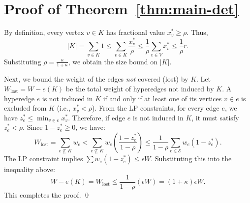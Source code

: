 \section{Proof of Theorem~\ref{thm:main-det}}
\label{app:mainproof}

By definition, every vertex $v \in K$ has fractional value $x^*_v \ge \rho$. Thus,
\begin{equation}
\label{eq:size-bound}
|K| = \sum_{v \in K} 1 \le \sum_{v \in K} \frac{x^*_v}{\rho} \le \frac{1}{\rho} \sum_{v \in V} x^*_v \le \frac{1}{\rho} r.
\end{equation}
Substituting $\rho = \frac{\kappa}{1+\kappa}$, we obtain the size bound on $|K|$.

Next, we bound the weight of the edges \emph{not} covered (lost) by $K$. Let $W_{\text{lost}} = W - e(K)$ be the total weight of hyperedges not induced by $K$. A hyperedge $e$ is not induced in $K$ if and only if at least one of its vertices $v \in e$ is excluded from $K$ (i.e., $x^*_v < \rho$). From the LP constraints, for every edge $e$, we have $z^*_e \le \min_{v \in e} x^*_v$. Therefore, if edge $e$ is not induced in $K$, it must satisfy $z^*_e < \rho$.  Since $1-z^*_e \ge 0$, we have:
\[
W_{\text{lost}} = \sum_{e \not\subseteq K} w_e < \sum_{e \not\subseteq K} w_e \left( \frac{1 - z^*_e}{1 - \rho} \right) \le \frac{1}{1-\rho} \sum_{e \in \mathcal{E}} w_e (1 - z^*_e).
\]
The LP constraint  implies $\sum w_e (1 - z^*_e) \le \epsilon W$. Substituting this into the inequality above:
\[
W - e(K) = W_{\text{lost}} \le \frac{1}{1-\rho} (\epsilon W) = (1+\kappa) \epsilon W.
\]
This completes the proof. \qed
